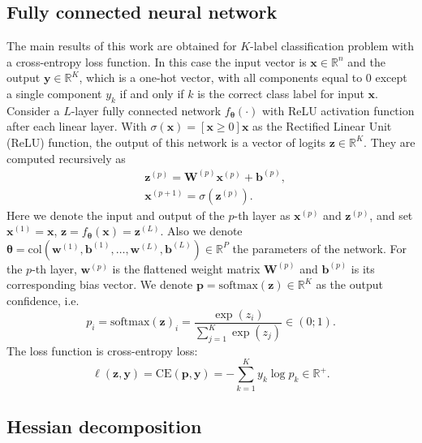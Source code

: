 \documentclass{article}
\begin{document}
\subsection{Fully connected neural network} 

The main results of this work are obtained for $K$-label classification problem with a cross-entropy loss function. In this case the input vector is $\mathbf{x} \in \mathbb{R}^{n}$ and the output $\mathbf{y} \in \mathbb{R}^{K}$, which is a one-hot vector, with all components equal to $0$ except a single component $y_k$ if and only if $k$ is the correct class label for input $\mathbf{x}$. Consider a $L$-layer fully connected network $f_{\boldsymbol{\theta}}(\cdot)$ with ReLU activation function after each linear layer. With $\sigma(\mathbf{x}) = \left[ \mathbf{x} \geqslant 0 \right] \mathbf{x}$ as the Rectified Linear Unit (ReLU) function, the output of this network is a vector of logits $\mathbf{z} \in \mathbb{R}^{K}$. They are computed recursively as
\begin{align*}\label{align:fc}
    &\mathbf{z}^{(p)} = \mathbf{W}^{(p)} \mathbf{x}^{(p)} + \mathbf{b}^{(p)}, \\
    &\mathbf{x}^{(p+1)} = \sigma(\mathbf{z}^{(p)}).
\end{align*}
Here we denote the input and output of the $p$-th layer as $\mathbf{x}^{(p)}$ and $\mathbf{z}^{(p)}$, and set $\mathbf{x}^{(1)} = \mathbf{x}$, $\mathbf{z} = f_{\boldsymbol{\theta}}(\mathbf{x}) = \mathbf{z}^{(L)}$. Also we denote $\boldsymbol{\theta} = \mathrm{col}(\mathbf{w}^{(1)}, \mathbf{b}^{(1)}, \ldots, \mathbf{w}^{(L)}, \mathbf{b}^{(L)}) \in \mathbb{R}^{P}$ the parameters of the network. For the $p$-th layer, $\mathbf{w}^{(p)}$ is the flattened weight matrix $\mathbf{W}^{(p)}$ and $\mathbf{b}^{(p)}$ is its corresponding bias vector. We denote $\mathbf{p} = \mathrm{softmax}(\mathbf{z}) \in \mathbb{R}^{K}$ as the output confidence, i.e.
\[ p_i = \mathrm{softmax}(\mathbf{z})_i = \dfrac{\exp{(z_i)}}{\sum_{j=1}^{K} \exp{(z_j)}} \in (0; 1). \] 
The loss function is cross-entropy loss: 
\[ \ell(\mathbf{z}, \mathbf{y}) = \mathrm{CE}(\mathbf{p}, \mathbf{y}) = - \sum_{k=1}^{K} y_k \log p_k \in \mathbb{R}^{+}. \]

\subsection{Hessian decomposition} 
\end{document}
